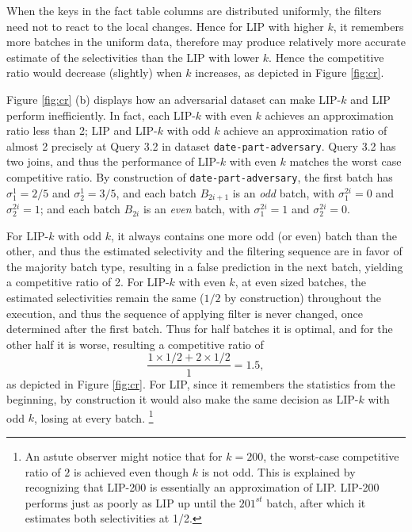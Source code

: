 When the keys in the fact table columns are distributed uniformly, the filters need not to react to the local changes. Hence for LIP with higher $k$, it remembers more batches in the uniform data, therefore may produce relatively more accurate estimate of the selectivities than the LIP with lower $k$. Hence the competitive ratio would decrease (slightly) when $k$ increases, as depicted in Figure \ref{fig:cr}.  


Figure \ref{fig:cr} (b) displays how an adversarial dataset can make LIP-$k$ and LIP perform inefficiently. In fact, each LIP-$k$ with even $k$ achieves an approximation ratio less than 2; LIP and LIP-$k$ with odd $k$ achieve an approximation ratio of almost 2 precisely at Query 3.2 in dataset \texttt{date-part-adversary}. Query 3.2 has two joins, and thus the performance of LIP-$k$ with even $k$ matches the worst case competitive ratio. By construction of \texttt{date-part-adversary}, the first batch has $\sigma^{1}_{1} = 2/5$ and $\sigma^{1}_{2} = 3/5$, and  each batch $B_{2i+1}$ is an \textit{odd} batch, with $\sigma^{2i}_{1} = 0$ and $\sigma^{2i}_{2} = 1$; and each batch $B_{2i}$ is an \textit{even} batch, with $\sigma^{2i}_{1} = 1$ and $\sigma^{2i}_{2} = 0$. 

For LIP-$k$ with odd $k$, it always contains one more odd (or even) batch than the other, and thus the estimated selectivity and the filtering sequence are in favor of the majority batch type, resulting in a false prediction in the next batch, yielding a competitive ratio of 2. For LIP-$k$ with even $k$, at even sized batches, the estimated selectivities remain the same ($1/2$ by construction) throughout the execution, and thus the sequence of applying filter is never changed, once determined after the first batch. Thus for half batches it is optimal, and for the other half it is worse, resulting a competitive ratio of \[ \frac{1 \times 1/2 + 2 \times 1/2}{1} = 1.5,\] as depicted in Figure \ref{fig:cr}. For LIP, since it remembers the statistics from the beginning, by construction it would also make the same decision as LIP-$k$ with odd $k$, losing at every batch. 
\footnote{An astute observer might notice that for $k = 200$, the worst-case competitive ratio of $2$ is achieved even though $k$ is not odd. This is explained by recognizing that LIP-200 is essentially an approximation of LIP. LIP-200 performs just as poorly as LIP up until  the $201^{st}$ batch, after which it estimates both selectivities at 1/2.}








